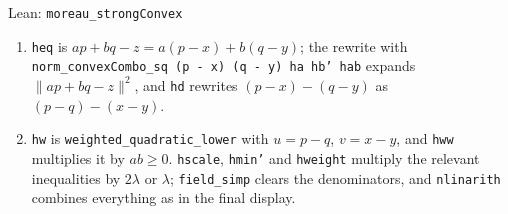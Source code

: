 \documentclass[11pt,a4paper]{article}
\begin{document}
\begin{leanbox}{Lean: \texttt{moreau\_\allowbreak{}strongConvex}}
\begin{enumerate}
\item \texttt{heq} is \(ap+bq-z=a(p-x)+b(q-y)\); the rewrite with \texttt{norm\_\allowbreak{}convex\allowbreak{}Combo\_\allowbreak{}sq (p -\allowbreak{} x) (q -\allowbreak{} y) ha hb' hab} expands \(\|ap+bq-z\|^2\), and \texttt{hd} rewrites \((p-x)-(q-y)\) as \((p-q)-(x-y)\).

\item \texttt{hw} is \texttt{weighted\_\allowbreak{}quadratic\_\allowbreak{}lower} with \(u=p-q\), \(v=x-y\), and \texttt{hww} multiplies it by \(ab\ge0\). \texttt{hscale}, \texttt{hmin'} and \texttt{hweight} multiply the relevant inequalities by \(2\lambda\) or \(\lambda\); \texttt{field\_\allowbreak{}simp} clears the denominators, and \texttt{nlinarith} combines everything as in the final display.

\end{enumerate}
\end{leanbox}
\end{document}
